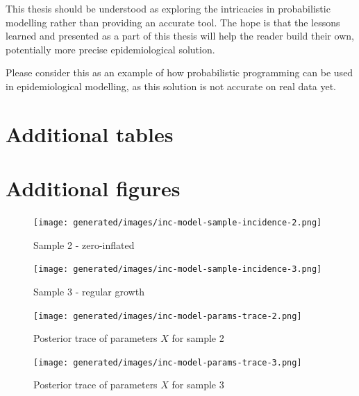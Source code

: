 \documentclass[
  digital, %
  oneside, %
  lof,     %
  lot,     %
]{fithesis4}
\begin{document}
This thesis should be understood as exploring the intricacies in probabilistic modelling rather than providing an accurate tool.
The hope is that the lessons learned and presented as a part of this thesis will help the reader build their own, potentially more precise epidemiological solution.

Please consider this as an example of how probabilistic programming can be used in epidemiological modelling, as this solution is not accurate on real data yet.


\printbibliography[heading=bibintoc]

\appendix

\chapter{Additional tables}






\chapter{Additional figures}

\begin{figure}[H]
  \begin{center}
    \texttt{[image: generated/images/inc-model-sample-incidence-2.png]}
  \end{center}
  \caption{Sample 2 - zero-inflated}
  \label{fig:dev-incidence-2}
\end{figure}

\begin{figure}[H]
  \begin{center}
    \texttt{[image: generated/images/inc-model-sample-incidence-3.png]}
  \end{center}
  \caption{Sample 3 - regular growth}
  \label{fig:dev-incidence-3}
\end{figure}



\begin{figure}[H]
  \begin{center}
    \texttt{[image: generated/images/inc-model-params-trace-2.png]}
  \end{center}
  \caption{Posterior trace of parameters $X$ for sample 2}
  \label{fig:params-trace-2}
\end{figure}



\begin{figure}[H]
  \begin{center}
    \texttt{[image: generated/images/inc-model-params-trace-3.png]}
  \end{center}
  \caption{Posterior trace of parameters $X$ for sample 3}
  \label{fig:params-trace-3}
\end{figure}
\end{document}
